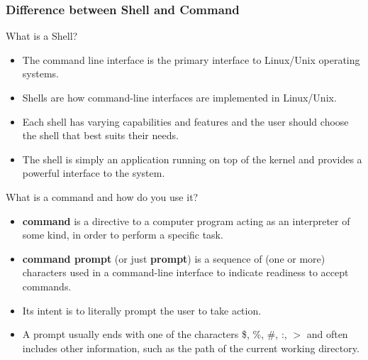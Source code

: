 \documentclass[10pt,t]{beamer}
\begin{document}
\begin{frame}[fragile]
  \frametitle{Difference between Shell and Command}
  \begin{block}{What is a Shell?}
    \begin{itemize}
    \item The command line interface is the primary interface to Linux/Unix operating systems.
    \item Shells are how command-line interfaces are implemented in Linux/Unix.
    \item Each shell has varying capabilities and features and the user should choose the shell that best suits their needs.
    \item The shell is simply an application running on top of the kernel and provides a powerful interface to the system.
    \end{itemize}
  \end{block}
  \begin{exampleblock}{What is a command and how do you use it?}
    \begin{itemize}
    \item \textbf{command} is a directive to a computer program acting as an interpreter of some kind, in order to perform a specific task.
    \item \textbf{command prompt} (or just \textbf{prompt}) is a sequence of (one or more) characters used in a command-line interface to indicate readiness to accept commands.
    \item Its intent is to literally prompt the user to take action. 
    \item A prompt usually ends with one of the characters \$, \%, \#, :, $>$ and often includes other information, such as the path of the current working directory.
    \end{itemize}
  \end{exampleblock}
\end{frame}
  
\end{document}
